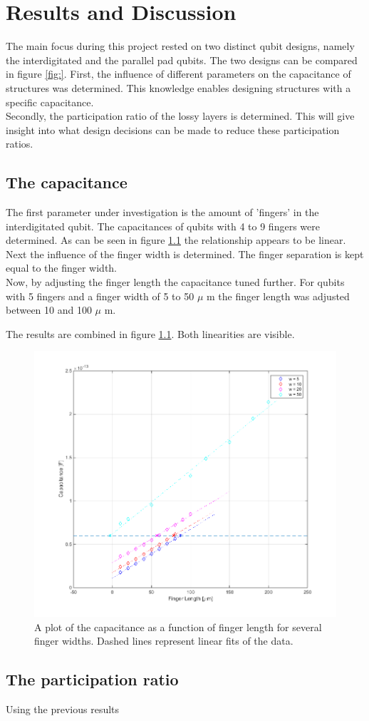 \chapter{Results and Discussion}
The main focus during this project rested on two distinct qubit designs, namely the interdigitated and the parallel pad qubits. The two designs can be compared in figure \ref{fig:}. First, the influence of different parameters on the capacitance of structures was determined. This knowledge enables designing structures with a specific capacitance. \\
Secondly, the participation ratio of the lossy layers is determined. This will give insight into what design decisions can be made to reduce these participation ratios.

\section{The capacitance}
The first parameter under investigation is the amount of 'fingers' in the interdigitated qubit. The capacitances of qubits with 4 to 9 fingers were determined.  As can be seen in figure \ref{fig:Capacitances_g5_50} the relationship appears to be linear. \\
Next the influence of the finger width is determined. The finger separation is kept equal to the finger width. \\
Now, by adjusting the finger length the capacitance tuned further. For qubits with 5 fingers and a finger width of 5 to 50 \(\mu\) m the finger length was adjusted between 10 and 100 \(\mu\) m. 

The results are combined in figure \ref{fig:Capacitances_g5_50}. Both linearities are visible.

\begin{figure}
	\centering
	\includegraphics[width = \textwidth]{Figures/Capacitances_g5_50}
	\caption{A plot of the capacitance as a function of finger length for several finger widths. Dashed lines represent linear fits of the data.}
	\label{fig:Capacitances_g5_50}
\end{figure}

\section{The participation ratio}
Using the previous results 
